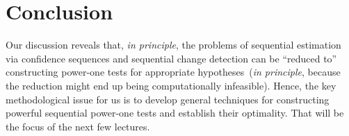\documentclass[12pt]{article}
\begin{document}
\section{Conclusion}
Our discussion reveals that, \emph{in principle}, the problems of sequential estimation via confidence sequences and sequential change detection can be ``reduced to'' constructing power-one tests for appropriate hypotheses~(\emph{in principle}, because the reduction might end up being computationally infeasible). Hence, the key methodological issue for us is to develop general techniques for constructing powerful sequential power-one tests and establish their optimality. That will be the focus of the next few lectures. 


\end{document}
